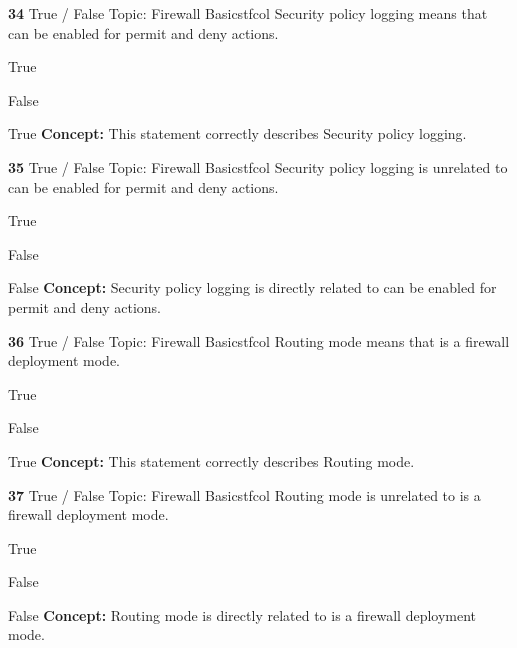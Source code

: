 \documentclass[10pt,a4paper]{article}
\begin{document}
\begin{qcard}{\color{white}\textbf{34} \hfill \small True / False \textbar{} Topic: Firewall Basics}{tfcol}
Security policy logging means that can be enabled for permit and deny actions.

\begin{qoptions}
\item True
\item False
\end{qoptions}
\begin{explainbox}{True}
\textbf{Concept:} This statement correctly describes Security policy logging.
\end{explainbox}
\end{qcard}

\begin{qcard}{\color{white}\textbf{35} \hfill \small True / False \textbar{} Topic: Firewall Basics}{tfcol}
Security policy logging is unrelated to can be enabled for permit and deny actions.

\begin{qoptions}
\item True
\item False
\end{qoptions}
\begin{explainbox}{False}
\textbf{Concept:} Security policy logging is directly related to can be enabled for permit and deny actions.
\end{explainbox}
\end{qcard}

\begin{qcard}{\color{white}\textbf{36} \hfill \small True / False \textbar{} Topic: Firewall Basics}{tfcol}
Routing mode means that is a firewall deployment mode.

\begin{qoptions}
\item True
\item False
\end{qoptions}
\begin{explainbox}{True}
\textbf{Concept:} This statement correctly describes Routing mode.
\end{explainbox}
\end{qcard}

\begin{qcard}{\color{white}\textbf{37} \hfill \small True / False \textbar{} Topic: Firewall Basics}{tfcol}
Routing mode is unrelated to is a firewall deployment mode.

\begin{qoptions}
\item True
\item False
\end{qoptions}
\begin{explainbox}{False}
\textbf{Concept:} Routing mode is directly related to is a firewall deployment mode.
\end{explainbox}
\end{qcard}
\end{document}
